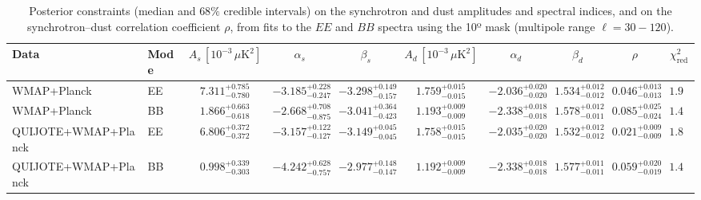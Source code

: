 \begin{table}[h]
\centering
\scriptsize
\setlength{\tabcolsep}{4pt}
\caption{Posterior constraints (median and $68\%$ credible intervals) on the synchrotron and dust amplitudes and spectral indices, and on the synchrotron--dust correlation coefficient $\rho$, from fits to the $EE$ and $BB$ spectra using the 10º mask (multipole range $\ell=30-120$).}
\label{tab:fit_all_pairs_ell30-120}
\begin{tabular}{llcccccccc}
\toprule
Data & Mode & $A_s\,[10^{-3}\,\mu\mathrm{K}^2]$ & $\alpha_s$ & $\beta_s$ & $A_d\,[10^{-3}\,\mu\mathrm{K}^2]$ & $\alpha_d$ & $\beta_d$ & $\rho$ & $\chi^2_\mathrm{red}$ \\
\midrule
WMAP+Planck & EE & $7.311^{+0.785}_{-0.780}$ & $-3.185^{+0.228}_{-0.247}$ & $-3.298^{+0.149}_{-0.157}$ & $1.759^{+0.015}_{-0.015}$ & $-2.036^{+0.020}_{-0.020}$ & $1.534^{+0.012}_{-0.012}$ & $0.046^{+0.013}_{-0.013}$ & $1.99$ \\
WMAP+Planck & BB & $1.866^{+0.663}_{-0.618}$ & $-2.668^{+0.708}_{-0.875}$ & $-3.041^{+0.364}_{-0.423}$ & $1.193^{+0.009}_{-0.009}$ & $-2.338^{+0.018}_{-0.018}$ & $1.578^{+0.012}_{-0.011}$ & $0.085^{+0.025}_{-0.024}$ & $1.47$ \\
QUIJOTE+WMAP+Planck & EE & $6.806^{+0.372}_{-0.372}$ & $-3.157^{+0.122}_{-0.127}$ & $-3.149^{+0.045}_{-0.045}$ & $1.758^{+0.015}_{-0.015}$ & $-2.035^{+0.020}_{-0.020}$ & $1.532^{+0.012}_{-0.012}$ & $0.021^{+0.009}_{-0.009}$ & $1.87$ \\
QUIJOTE+WMAP+Planck & BB & $0.998^{+0.339}_{-0.303}$ & $-4.242^{+0.628}_{-0.757}$ & $-2.977^{+0.148}_{-0.147}$ & $1.192^{+0.009}_{-0.009}$ & $-2.338^{+0.018}_{-0.018}$ & $1.577^{+0.011}_{-0.011}$ & $0.059^{+0.020}_{-0.019}$ & $1.46$ \\
\bottomrule
\end{tabular}
\end{table}